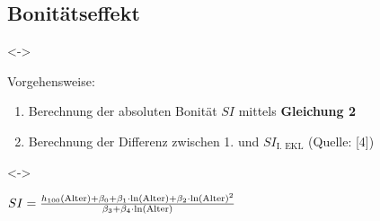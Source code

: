 \subsection{Bonitätseffekt}

\begin{frame}[c]
  \visible<\theFirstElement->{Vorgehensweise:
  \begin{enumerate}
  \item Berechnung der absoluten Bonität \(SI\) mittels \textbf{Gleichung 2}
  \item Berechnung der Differenz zwischen 1. und \(SI_{\text{I. EKL}}\) (Quelle: [4])
  \end{enumerate}}

  \visible<\theFirstElement->{\begin{center}
      \begin{minipage}{0.5\linewidth}
        \centerline{\(SI = \frac{h_{100}(\text{Alter}) + \beta_0 + \beta_1 \cdot \ln(\text{Alter}) + \beta_2 \cdot \ln(\text{Alter})^2 }{\beta_3 + \beta_4 \cdot \ln(\text{Alter})}{}\)}
        \vspace{\captiondistance}
      \end{minipage}
    \end{center}}

\end{frame}

